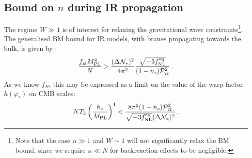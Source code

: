 \subsection{\texorpdfstring{Bound on $n$ during IR propagation}{Bound on n during IR propagation}}
\label{sec:ir-largen-bound-multi}

The regime $W \gg 1$ is of interest for 
relaxing the gravitational wave constraints\footnote{Note that 
the case $n \gg 1$ and
$W \sim 1$ will not significantly relax the BM bound, 
since we require $n \ll N$ for backreaction effects to be negligible.}. 
The generalised BM bound for IR models, with branes propagating towards the bulk, is given by 
:
% 
\begin{equation}
\label{eq:f2IRlower-multi}
\frac{f_BM_{\mathrm{PL}}^4}{N} > \frac{(\Delta \mathcal{N}_*)^2}{4\pi^2}
\frac{\sqrt{-3f_{\mathrm{NL}}^{\mathrm{eq}}}}{(1-n_s)\mathcal{P}_{\mathcal{R}}^2 }  \,.
\end{equation}
% 
As we know $f_B$, this may be expressed as 
a limit on the value of the warp factor $h(\varphi_*)$ on CMB scales: 
% 
\begin{equation}
\label{eq:warptorelax}
N T_3 \left(\frac{h_*}{M_{\mathrm{PL}}}\right)^4 < 
\frac{8\pi^2 (1-n_s)\mathcal{P}_{\mathcal{R}}^2 }{\sqrt{-3f_{\mathrm{NL}}^{\mathrm{eq}}}(\Delta \mathcal{N}_*)^2} \,.
\end{equation}
% 


